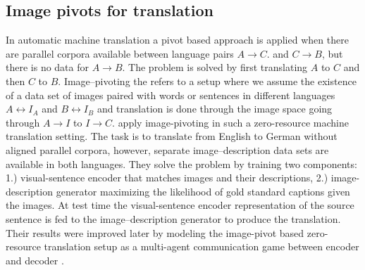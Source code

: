 \subsection{Image pivots for translation}
\label{sec:imgpivot}

In automatic machine translation a pivot based approach is applied
when there are parallel corpora available between language pairs $A\rightarrow C$.
and $C \rightarrow B$, but there is no data for $A\rightarrow B$. The problem is
solved by first translating $A$ to $C$ and then $C$ to $B$.
Image--pivoting the refers to a setup where we assume the existence of a data set
of images paired with words or sentences in different languages $A \leftrightarrow I_A$ and
$B \leftrightarrow I_B$ and translation is done through the image space
going  through $A \rightarrow I$ to $I \rightarrow C$.
\cite{nakayama2017zero} apply image-pivoting in such a zero-resource machine
translation setting. The task is to translate from English to German without
aligned parallel corpora, however, separate image--description data sets are
available in both languages. They solve the problem by
training two components: 1.) visual-sentence encoder that matches images and their descriptions,
2.) image-description generator maximizing the likelihood of gold standard captions given the images.
At test time the visual-sentence encoder representation of the source sentence is fed to the
image--description generator to produce the translation.
Their results were improved later by modeling
the image-pivot based zero-resource translation setup as a
multi-agent communication game between encoder and decoder
\citep{chen2018zero,lee2017emergent}.






